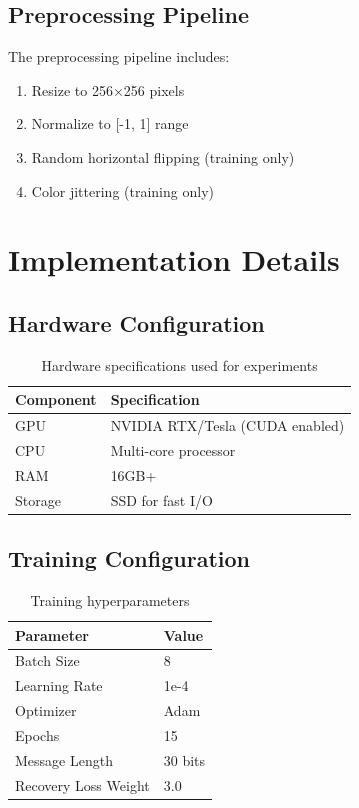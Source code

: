 \documentclass[12pt,a4paper]{report}
\begin{document}
\subsection{Preprocessing Pipeline}

The preprocessing pipeline includes:

\begin{enumerate}
    \item Resize to 256×256 pixels
    \item Normalize to [-1, 1] range
    \item Random horizontal flipping (training only)
    \item Color jittering (training only)
\end{enumerate}

\section{Implementation Details}

\subsection{Hardware Configuration}

\begin{table}[H]
    \centering
    \caption{Hardware specifications used for experiments}
    \label{tab:hardware}
    \begin{tabular}{@{}ll@{}}
        \toprule
        Component & Specification \\
        \midrule
        GPU & NVIDIA RTX/Tesla (CUDA enabled) \\
        CPU & Multi-core processor \\
        RAM & 16GB+ \\
        Storage & SSD for fast I/O \\
        \bottomrule
    \end{tabular}
\end{table}

\subsection{Training Configuration}

\begin{table}[H]
    \centering
    \caption{Training hyperparameters}
    \label{tab:training_params}
    \begin{tabular}{@{}ll@{}}
        \toprule
        Parameter & Value \\
        \midrule
        Batch Size & 8 \\
        Learning Rate & 1e-4 \\
        Optimizer & Adam \\
        Epochs & 15 \\
        Message Length & 30 bits \\
        Recovery Loss Weight & 3.0 \\
        \bottomrule
    \end{tabular}
\end{table}
\end{document}
